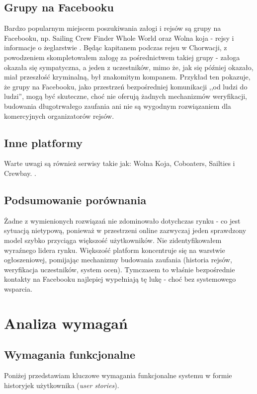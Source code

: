 \documentclass[shortabstract]{iithesis}
\begin{document}
\section{Grupy na Facebooku}
Bardzo popularnym miejscem poszukiwania załogi i rejsów są grupy na Facebooku, np. Sailing Crew Finder Whole World oraz Wolna koja - rejsy i informacje o żeglarstwie \cite{fbcrewfinder,fbzeglarskie}. Będąc kapitanem podczas rejsu w Chorwacji, z powodzeniem skompletowałem załogę za pośrednictwem takiej grupy - załoga okazała się sympatyczna, a jeden z uczestników, mimo że, jak się później okazało, miał przeszłość kryminalną, był znakomitym kompanem. Przykład ten pokazuje, że grupy na Facebooku, jako przestrzeń bezpośredniej komunikacji ,,od ludzi do ludzi'', mogą być skuteczne, choć nie oferują żadnych mechanizmów weryfikacji, budowania długotrwałego zaufania ani nie są wygodnym rozwiązaniem dla komercyjnych organizatorów rejsów.

\section{Inne platformy}
Warte uwagi są również serwisy takie jak: Wolna Koja, Coboaters, Sailties i Crewbay.
\cite{wolnakoja,coboaters,sailties,crewbay}.

\section{Podsumowanie porównania}
Żadne z wymienionych rozwiązań nie zdominowało dotychczas rynku - co jest sytuacją nietypową, ponieważ w przestrzeni online zazwyczaj jeden sprawdzony model szybko przyciąga większość użytkowników. Nie zidentyfikowałem wyraźnego lidera rynku. Większość platform koncentruje się na warstwie ogłoszeniowej, pomijając mechanizmy budowania zaufania (historia rejsów, weryfikacja uczestników, system ocen). Tymczasem to właśnie bezpośrednie kontakty na Facebooku najlepiej wypełniają tę lukę - choć bez systemowego wsparcia.


\chapter{Analiza wymagań}

\section{Wymagania funkcjonalne}
Poniżej przedstawiam kluczowe wymagania funkcjonalne systemu w formie historyjek użytkownika (\textit{user stories}).
\end{document}
